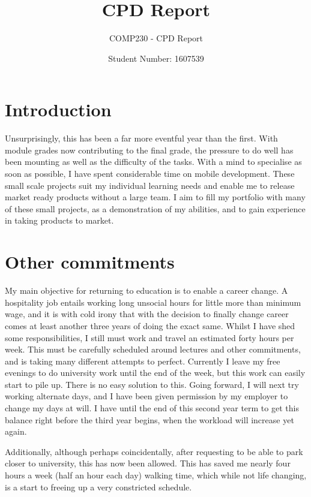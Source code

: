 \documentclass{scrartcl}
\title{CPD Report}
\subtitle{COMP230 - CPD Report}
\author{Student Number: 1607539}
\begin{document}
\maketitle

\section*{Introduction}

Unsurprisingly, this has been a far more eventful year than the first. With module grades now contributing to the final grade, the pressure to do well has been mounting as well as the difficulty of the tasks. With a mind to specialise as soon as possible, I have spent considerable time on mobile development. These small scale projects suit my individual learning needs and enable me to release market ready products without a large team. I aim to fill my portfolio with many of these small projects, as a demonstration of my abilities, and to gain experience in taking products to market.
 
\section*{Other commitments}

My main objective for returning to education is to enable a career change. A hospitality job entails working long unsocial hours for little more than minimum wage, and it is with cold irony that with the decision to finally change career comes at least another three years of doing the exact same. Whilst I have shed some responsibilities, I still must work and travel an estimated forty hours per week. This must be carefully scheduled around lectures and other commitments, and is taking many different attempts to perfect. Currently I leave my free evenings to do university work until the end of the week, but this work can easily start to pile up. There is no easy solution to this. Going forward, I will next try working alternate days, and I have been given permission by my employer to change my days at will. I have until the end of this second year term to get this balance right before the third year begins, when the workload will increase yet again.

Additionally, although perhaps coincidentally, after requesting to be able to park closer to university, this has now been allowed. This has saved me nearly four hours a week (half an hour each day) walking time, which while not life changing, is a start to freeing up a very constricted schedule.
\end{document}
